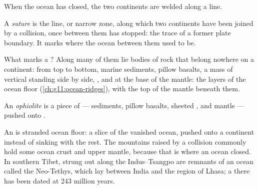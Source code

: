 When the ocean has closed, the two continents are welded along a line.

\begin{definition}[Suture]\label{def:g12:mountain-building:suture}
A \emph{suture} is the line, or narrow zone, along which two
continents have been joined by a collision, once  between them
has stopped: the trace of a former plate boundary. It marks where the ocean
between them used to be.
\end{definition}

What marks a ? Along many of them lie bodies of rock that belong
nowhere on a continent: from top to bottom, marine sediments, pillow
basalts, a mass of vertical  standing side by side, , and at the
base  of the mantle: the layers of the ocean floor
(\cref{ch:g11:ocean-ridges}), with the top of the mantle beneath them.

\begin{definition}[Ophiolite]\label{def:g12:mountain-building:ophiolite}
An \emph{ophiolite} is a piece of  ---
sediments, pillow basalts, sheeted ,  and mantle  ---
pushed onto .
\end{definition}

An  is stranded ocean floor: a slice of the vanished ocean, pushed
onto a continent instead of sinking with the rest. The mountains raised by
a collision commonly hold some ocean crust and upper mantle, because that is
where an ocean closed. In southern Tibet,  strung
out along the Indus--Tsangpo  are remnants of an ocean called the
Neo-Tethys, which lay between India and the region of Lhasa; a  there
has been dated at 243 million years.

